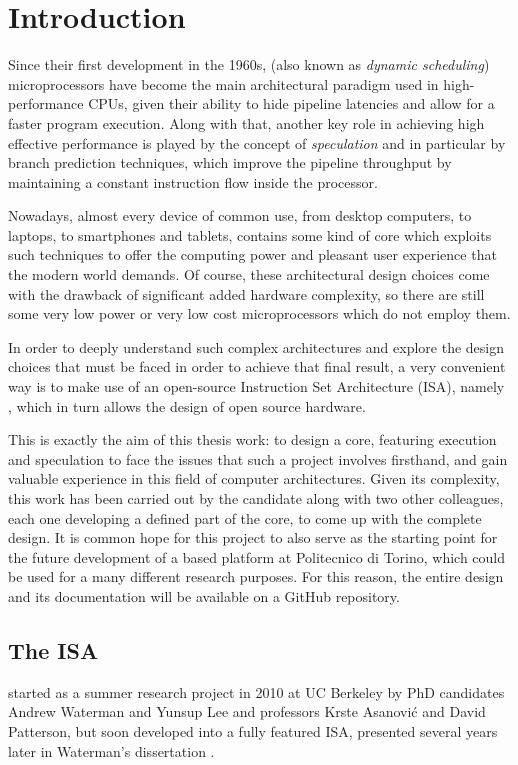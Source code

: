 \chapter{Introduction}
Since their first development in the 1960s, \emph{\ooo} (also known as \emph{dynamic scheduling}) microprocessors have become the main architectural paradigm used in high-performance CPUs, given their ability to hide pipeline latencies and allow for a faster program execution. Along with that, another key role in achieving high effective performance is played by the concept of \emph{speculation} and in particular by branch prediction techniques, which improve the pipeline throughput by maintaining a constant instruction flow inside the processor.

Nowadays, almost every device of common use, from desktop computers, to laptops, to smartphones and tablets, contains some kind of \ooo core which exploits such techniques to offer the computing power and pleasant user experience that the modern world demands. Of course, these architectural design choices come with the drawback of significant added hardware complexity, so there are still some very low power or very low cost microprocessors which do not employ them.

In order to deeply understand such complex architectures and explore the design choices that must be faced in order to achieve that final result, a very convenient way is to make use of an open-source Instruction Set Architecture (ISA), namely \riscv, which in turn allows the design of open source hardware. 

This is exactly the aim of this thesis work: to design a \riscv core, featuring \ooo execution and speculation to face the issues that such a project involves firsthand, and gain valuable experience in this field of computer architectures. Given its complexity, this work has been carried out by the candidate along with two other colleagues, each one developing a defined part of the core, to come up with the complete design. It is common hope for this project to also serve as the starting point for the future development of a \riscv based platform at Politecnico di Torino, which could be used for a many different research purposes. For this reason, the entire design and its documentation will be available on a GitHub repository.

\section{The \riscv ISA}
\riscv started as a summer research project in 2010 at UC Berkeley by PhD candidates Andrew Waterman and Yunsup Lee and professors Krste Asanović and David Patterson, but soon developed into a fully featured ISA, presented several years later in Waterman's dissertation \cite{waterman}. 

